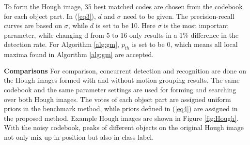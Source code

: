 \documentclass[10pt,twocolumn,letterpaper]{article}
\begin{document}
To form the Hough image, 35 best matched codes are chosen from the codebook for each object part. In (\ref{eq3}), $d$ and $\sigma$ need to be given. The precision-recall curves are based on $\sigma$, while $d$ is set to be 10. Here $\sigma$ is the most important parameter, while changing d from 5 to 16 only results in a 1\% difference in the detection rate. For Algorithm \ref{alg:gm}, $p_{th}$ is set to be 0, which means all local maxima found in Algorithm \ref{alg:gm} are accepted.

\textbf{Comparisons} For comparison, concurrent detection and recognition are done on the Hough images formed with and without motion grouping results. The same codebook and the same parameter settings are used for forming and searching over both Hough images. The votes of each object part are assigned uniform priors in the benchmark method, while priors defined in (\ref{eq4}) are assigned in the proposed method. Example Hough images are shown in Figure \ref{fig:Hough}. With the noisy codebook, peaks of different objects on the original Hough image not only mix up in position but also in class label.
\end{document}
